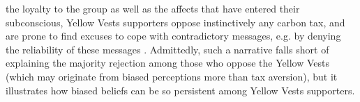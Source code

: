 \documentclass[12pt]{article} %
\begin{document}
the loyalty to the group as well as the affects that have entered their subconscious, Yellow Vests supporters oppose instinctively any carbon tax, and are prone to find excuses to cope with contradictory messages, e.g. by denying the reliability of these messages \citep{golman_preference_2016}. Admittedly, such a narrative falls short of explaining the majority rejection among those who oppose the Yellow Vests (which may originate from biased perceptions more than tax aversion), but it illustrates how biased beliefs can be so persistent among Yellow Vests supporters.

\end{document}
